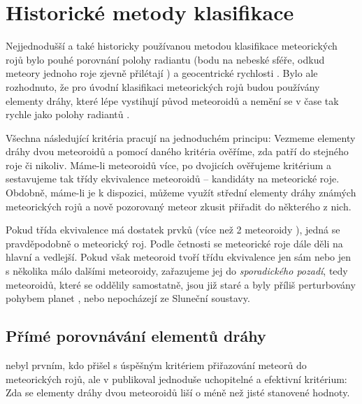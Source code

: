 \chapter{Historické metody klasifikace}%
Nejjednodušší a také historicky používanou metodou klasifikace meteorických rojů bylo pouhé porovnání polohy radiantu (bodu na nebeské sféře, odkud meteory jednoho roje zjevně přilétají \cite{glossary}) a geocentrické rychlosti \cite{radiosurvey}. Bylo ale rozhodnuto, že pro úvodní klasifikaci meteorických rojů budou používány elementy dráhy, které lépe vystihují původ meteoroidů a nemění se v čase tak rychle jako polohy radiantů \cite{radiosurvey}.


\medskip

Všechna následující kritéria pracují na jednoduchém principu: Vezmeme elementy dráhy dvou meteoroidů a pomocí daného kritéria ověříme, zda patří do stejného roje či nikoliv. Máme-li meteoroidů více, po dvojicích ověřujeme kritérium a sestavujeme tak třídy ekvivalence meteoroidů -- kandidáty na meteorické roje. Obdobně, máme-li je k dispozici, můžeme využít střední elementy dráhy známých meteorických rojů a nově pozorovaný meteor zkusit přiřadit do některého z nich.

Pokud třída ekvivalence má dostatek prvků (více než 2 meteoroidy \cite{radiosurvey}), jedná se pravděpodobně o meteorický roj. Podle četnosti se meteorické roje dále děli na hlavní a vedlejší. Pokud však meteoroid tvoří třídu ekvivalence jen sám nebo jen s několika málo dalšími meteoroidy, zařazujeme jej do \textit{sporadického pozadí}, tedy meteoroidů, které se oddělily samostatně, jsou již staré a byly příliš perturbovány pohybem planet \cite{dsh}, nebo nepocházejí ze Sluneční soustavy.

\section{Přímé porovnávání elementů dráhy}%
\citeauthor{radiosurvey} nebyl prvním, kdo přišel s úspěšným kritériem přiřazování meteorů do meteorických rojů, ale v \cite{radiosurvey} publikoval jednoduše uchopitelné a efektivní kritérium: Zda se elementy dráhy dvou meteoroidů liší o méně než jisté stanovené hodnoty.


